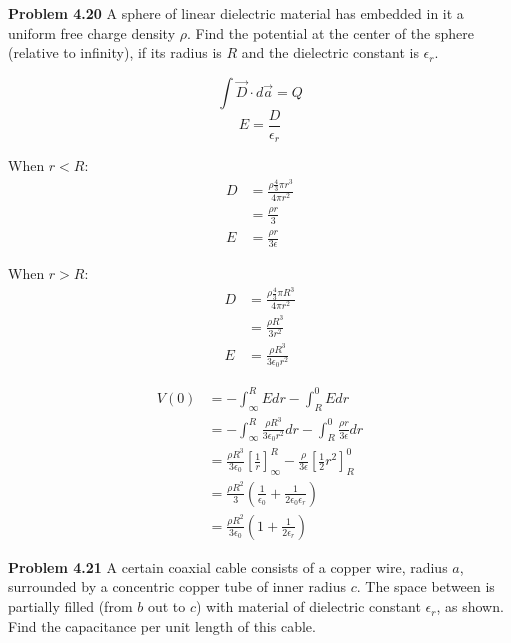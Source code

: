 \documentclass{article}
\begin{document}
\textbf{Problem 4.20}
A sphere of linear dielectric material has embedded in it a uniform free charge density $\rho$.
Find the potential at the center of the sphere (relative to infinity), if its radius is $R$ and the dielectric constant is $\epsilon_r$.

$$\int \vec{D} \cdot d\vec{a} = Q$$
$$E = \frac{D}{\epsilon_r}$$

When $r < R$:
\begin{equation*}
\begin{split}
	D & = \frac{\rho \frac{4}{3} \pi r^3}{4 \pi r^2} \\ %
	& = \frac{\rho r}{3} \\
	E & = \frac{\rho r}{3 \epsilon}
\end{split}
\end{equation*}

When $r > R$:
\begin{equation*}
\begin{split}
	D & = \frac{\rho \frac{4}{3} \pi R^3}{4 \pi r^2} \\ %
	& = \frac{\rho R^3}{3 r^2} \\
	E & = \frac{\rho R^3}{3 \epsilon_0 r^2}
\end{split}
\end{equation*}

\begin{equation*}
\begin{split}
	V(0) & = - \int_{\infty}^R E dr - \int_R^0 E dr \\
	& = - \int_{\infty}^R \frac{\rho R^3}{3 \epsilon_0 r^2} dr - \int_R^0 \frac{\rho r}{3 \epsilon} dr \\
	& = \frac{\rho R^3}{3 \epsilon_0} [\frac{1}{r}]_{\infty}^R - \frac{\rho}{3 \epsilon} [\frac{1}{2} r^2]_R^0 \\
	& = \frac{\rho R^2}{3} (\frac{1}{\epsilon_0} + \frac{1}{2 \epsilon_0 \epsilon_r}) \\
	& = \boxed{\frac{\rho R^2}{3 \epsilon_0} (1 + \frac{1}{2 \epsilon_r})}
\end{split}
\end{equation*}

\textbf{Problem 4.21}
A certain coaxial cable consists of a copper wire, radius $a$, surrounded by a concentric copper tube of inner radius $c$.
The space between is partially filled (from $b$ out to $c$) with material of dielectric constant $\epsilon_r$, as shown.
Find the capacitance per unit length of this cable. \\
\end{document}
